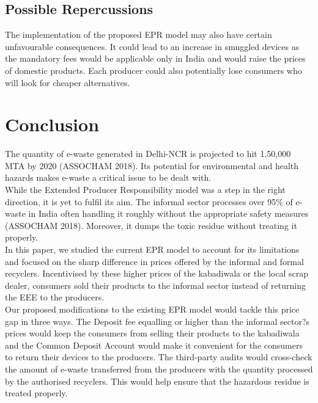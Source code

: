 \documentclass[a4paper, 12pt]{article}
\begin{document}
                    \subsection{Possible Repercussions}
                    
                    The implementation of the proposed EPR model may also have certain unfavourable consequences. It could lead to an increase in smuggled devices as the mandatory fees would be applicable only in India and would raise the prices of domestic products. Each producer could also potentially lose consumers who will look for cheaper alternatives.\\
                    
                    
                    \section{Conclusion}
                    
                    The quantity of e-waste generated in Delhi-NCR is projected to hit 1,50,000 MTA by 2020 (ASSOCHAM 2018). Its potential for environmental and health hazards makes e-waste a critical issue to be dealt with.\\
                     
                    While the Extended Producer Responsibility model was a step in the right direction, it is yet to fulfil its aim. The informal sector processes over 95\% of e-waste in India often handling it roughly without the appropriate safety measures (ASSOCHAM 2018). Moreover, it dumps the toxic residue without treating it properly. \\
                    
                    In this paper, we studied the current EPR model to account for its limitations and focused on the sharp difference in prices offered by the informal and formal recyclers. Incentivised by these higher prices of the kabadiwala or the local scrap dealer, consumers sold their products to the informal sector instead of returning the EEE to the producers. \\
                    
                    Our proposed modifications to the existing EPR model would tackle this price gap in three ways. The Deposit fee equalling or higher than the informal sector?s prices would keep the consumers from selling their products to the kabadiwala and the Common Deposit Account would make it convenient for the consumers to return their devices to the producers. The third-party audits would cross-check the amount of e-waste transferred from the producers with the quantity processed by the authorised recyclers. This would help ensure that the hazardous residue is treated properly.\\
                    
\end{document}
